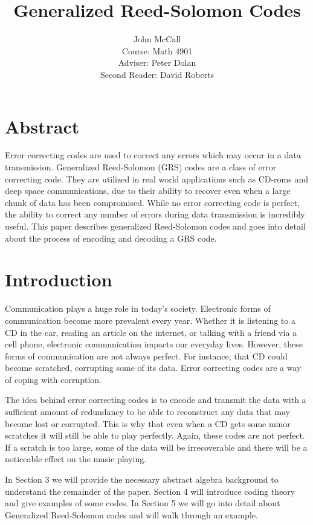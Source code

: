 \documentclass{article}
\title{Generalized Reed-Solomon Codes}
\author{John McCall\\Course: Math 4901\\Adviser: Peter Dolan\\Second Reader: David Roberts}
\begin{document}

\maketitle

\section{Abstract}
Error correcting codes are used to correct any errors which may occur in a data transmission. Generalized Reed-Solomon (GRS) codes are a class of error correcting code. They are utilized in real world applications such as CD-roms and deep space communications, due to their ability to recover even when a large chunk of data has been compromised. While no error correcting code is perfect, the ability to correct any number of errors during data transmission is incredibly useful. This paper describes generalized Reed-Solomon codes and goes into detail about the process of encoding and decoding a GRS code.

\section{Introduction}
Communication plays a huge role in today's society. Electronic forms of communication become more prevalent every year. Whether it is listening to a CD in the car, reading an article on the internet, or talking with a friend via a cell phone, electronic communication impacts our everyday lives. However, these forms of communication are not always perfect. For instance, that CD could become scratched, corrupting some of its data. Error correcting codes are a way of coping with corruption. 

The idea behind error correcting codes is to encode and transmit the data with a sufficient amount of redundancy to be able to reconstruct any data that may become lost or corrupted. This is why that even when a CD gets some minor scratches it will still be able to play perfectly. Again, these codes are not perfect. If a scratch is too large, some of the data will be irrecoverable and there will be a noticeable effect on the music playing.

In Section 3 we will provide the necessary abstract algebra background to understand the remainder of the paper. Section 4 will introduce coding theory and give examples of some codes. In Section 5 we will go into detail about Generalized Reed-Solomon codes and will walk through an example.
\end{document}
